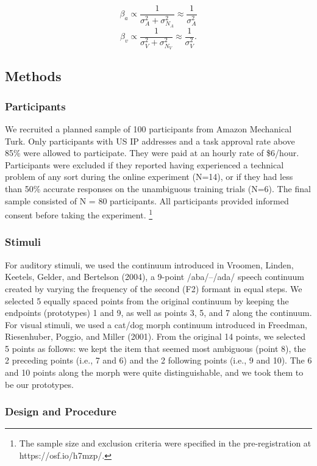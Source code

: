 \documentclass[english,,man,floatsintext]{apa6}
\let\rmarkdownfootnote\footnote%
\def\footnote{\protect\rmarkdownfootnote}
\theoremstyle{definition}
\theoremstyle{definition}
\theoremstyle{definition}
\theoremstyle{remark}
\begin{document}
\[\beta_a \propto \frac{1}{\sigma^2_{A} + \sigma^2_{N_A}} \approx  \frac{1}{\sigma^2_{A} }\]
\[\beta_v \propto \frac{1}{\sigma^2_{V} + \sigma^2_{N_V}} \approx  \frac{1}{\sigma^2_{V} }.\]

\subsection{Methods}\label{methods}

\subsubsection{Participants}\label{participants}

We recruited a planned sample of 100 participants from Amazon Mechanical
Turk. Only participants with US IP addresses and a task approval rate
above 85\% were allowed to participate. They were paid at an hourly rate
of \$6/hour. Participants were excluded if they reported having
experienced a technical problem of any sort during the online experiment
(N=14), or if they had less than 50\% accurate responses on the
unambiguous training trials (N=6). The final sample consisted of N = 80
participants. All participants provided informed consent before taking
the experiment.
\footnote{The sample size and exclusion criteria were specified in the pre-registration at https://osf.io/h7mzp/.}

\subsubsection{Stimuli}\label{stimuli}

For auditory stimuli, we used the continuum introduced in Vroomen,
Linden, Keetels, Gelder, and Bertelson (2004), a 9-point /aba/--/ada/
speech continuum created by varying the frequency of the second (F2)
formant in equal steps. We selected 5 equally spaced points from the
original continuum by keeping the endpoints (prototypes) 1 and 9, as
well as points 3, 5, and 7 along the continuum. For visual stimuli, we
used a cat/dog morph continuum introduced in Freedman, Riesenhuber,
Poggio, and Miller (2001). From the original 14 points, we selected 5
points as follows: we kept the item that seemed most ambiguous (point
8), the 2 preceding points (i.e., 7 and 6) and the 2 following points
(i.e., 9 and 10). The 6 and 10 points along the morph were quite
distinguishable, and we took them to be our prototypes.

\subsubsection{Design and Procedure}\label{design-and-procedure}
\end{document}
